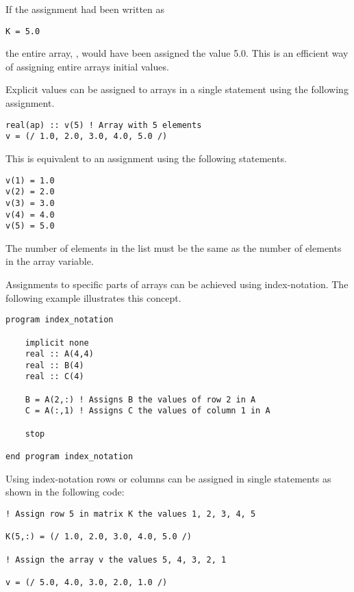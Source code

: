 If the assignment had been written as

\begin{lstlisting}
K = 5.0
\end{lstlisting}

the entire array, , would have been assigned the value 5.0. This is an efficient way of assigning entire arrays
initial values.

Explicit values can be assigned to arrays in a single statement using the following assignment.

\begin{lstlisting}
real(ap) :: v(5) ! Array with 5 elements
v = (/ 1.0, 2.0, 3.0, 4.0, 5.0 /)
\end{lstlisting}

This is equivalent to an assignment using the following statements.

\begin{lstlisting}
v(1) = 1.0
v(2) = 2.0
v(3) = 3.0
v(4) = 4.0
v(5) = 5.0
\end{lstlisting}

The number of elements in the list must be the same as the number of elements in the array variable.

Assignments to specific parts of arrays can be achieved using index-notation. The following example illustrates this concept.

\begin{lstlisting}[texcl]
program index_notation

    implicit none
    real :: A(4,4)
    real :: B(4)
    real :: C(4)

    B = A(2,:) ! Assigns B the values of row 2 in A
    C = A(:,1) ! Assigns C the values of column 1 in A

    stop

end program index_notation
\end{lstlisting}

Using index-notation rows or columns can be assigned in single statements as shown in the following code:

\begin{lstlisting}[texcl]
! Assign row 5 in matrix K the values 1, 2, 3, 4, 5

K(5,:) = (/ 1.0, 2.0, 3.0, 4.0, 5.0 /)

! Assign the array v the values 5, 4, 3, 2, 1

v = (/ 5.0, 4.0, 3.0, 2.0, 1.0 /)
\end{lstlisting}


